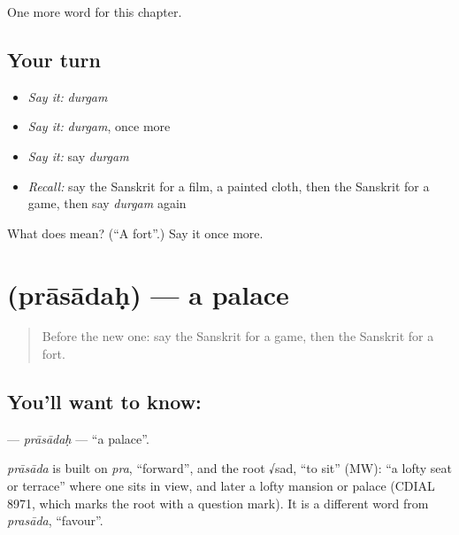 \begin{grammarlens}[title={What you've built}]
One more word for this chapter.
\end{grammarlens}

\subsection*{Your turn}
\begin{itemize}
\raggedright
  \item \emph{Say it:} \emph{durgam}
  \item \emph{Say it:} \emph{durgam}, once more
  \item \emph{Say it:} say \emph{durgam}
  \item \emph{Recall:} say the Sanskrit for a film, a painted cloth, then the Sanskrit for a game, then say \emph{durgam} again
\end{itemize}

\begin{tcolorbox}[breakable,colback=teal!4,colframe=teal!35!black,title={Before you move on}]
What does  mean? (\textquotedblleft{}A fort\textquotedblright{}.) Say it once more.
\end{tcolorbox}
\section[\texorpdfstring{\sk{प्रासादः} (prāsādaḥ)}{प्रासादः (prāsādaḥ)}]{ (prāsādaḥ) — a palace}

\label{lesson:SA-C250-prasadah}



\begin{quote}
Before the new one: say the Sanskrit for a game, then the Sanskrit for a fort.
\end{quote}

\subsection*{You'll want to know: }
\textbf{} — \emph{prāsādaḥ} — \textquotedblleft{}a palace\textquotedblright{}.

\begin{cousinweb}
\emph{prāsāda} is built on \emph{pra}, \textquotedblleft{}forward\textquotedblright{}, and the root √sad, \textquotedblleft{}to sit\textquotedblright{} (MW): \textquotedblleft{}a lofty seat or terrace\textquotedblright{} where one sits in view, and later a lofty mansion or palace (CDIAL 8971, which marks the root with a question mark). It is a different word from \emph{prasāda}, \textquotedblleft{}favour\textquotedblright{}.
\end{cousinweb}

